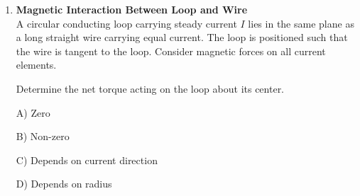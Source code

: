 \documentclass[12pt]{article}
\begin{document}
\begin{enumerate}
B) $2R$

C) $\dfrac{3R}{2}$

D) $3R$

\item \textbf{Magnetic Interaction Between Loop and Wire} \\ 


A circular conducting loop carrying steady current $I$ lies in the same plane as a long straight wire carrying equal current. The loop is positioned such that the wire is tangent to the loop. Consider magnetic forces on all current elements.

Determine the net torque acting on the loop about its center.

\begin{center}
\end{center}

A) Zero  

B) Non-zero  

C) Depends on current direction  

D) Depends on radius  

\end{enumerate}
\end{document}
